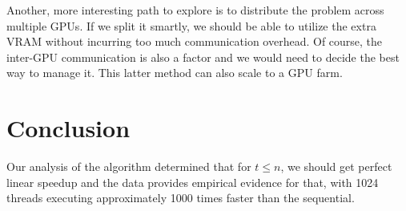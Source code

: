\documentclass[notitlepage, twocolumn]{article}
\begin{document}
Another, more interesting path to explore is to distribute the problem across multiple GPUs.
If we split it smartly, we should be able to utilize the extra VRAM without incurring too much communication overhead.
Of course, the inter-GPU communication is also a factor and we would need to decide the best way to manage it.
This latter method can also scale to a GPU farm.

\section{Conclusion}

Our analysis of the algorithm determined that for $t \leq n$, we should get perfect linear speedup and the data provides empirical evidence for that, with 1024 threads executing approximately 1000 times faster than the sequential.

\printbibliography
\end{document}
